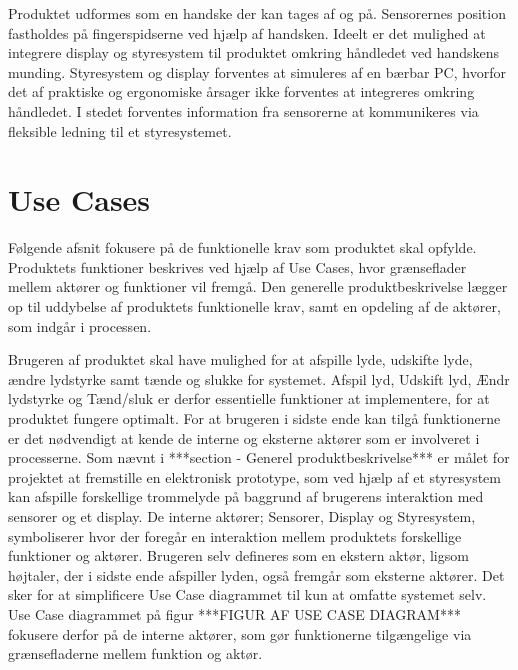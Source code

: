 Produktet udformes som en handske der kan tages af og på. Sensorernes position fastholdes på fingerspidserne ved hjælp af handsken. Ideelt er det mulighed at integrere display og styresystem til produktet omkring håndledet ved handskens munding. Styresystem og display forventes at simuleres af en bærbar PC, hvorfor det af praktiske og ergonomiske årsager ikke forventes at integreres omkring håndledet. I stedet forventes information fra sensorerne at kommunikeres via fleksible ledning til et styresystemet. 

\section{Use Cases}
Følgende afsnit fokusere på de funktionelle krav som produktet skal opfylde. Produktets funktioner beskrives ved hjælp af Use Cases, hvor grænseflader mellem aktører og funktioner vil fremgå. Den generelle produktbeskrivelse lægger op til uddybelse af produktets funktionelle krav, samt en opdeling af de aktører, som indgår i processen.

Brugeren af produktet skal have mulighed for at afspille lyde, udskifte lyde, ændre lydstyrke samt tænde og slukke for systemet. Afspil lyd, Udskift lyd, Ændr lydstyrke og Tænd/sluk er derfor essentielle funktioner at implementere, for at produktet fungere optimalt. For at brugeren i sidste ende kan tilgå funktionerne er det nødvendigt at kende de interne og eksterne aktører som er involveret i  processerne. Som nævnt i ***section - Generel produktbeskrivelse*** er målet for projektet at fremstille en elektronisk prototype, som ved hjælp af et styresystem kan afspille forskellige trommelyde på baggrund af brugerens interaktion med sensorer og et display. De interne aktører; Sensorer, Display og Styresystem, symboliserer hvor der foregår en interaktion mellem produktets forskellige funktioner og aktører. Brugeren selv defineres som en ekstern aktør, ligsom højtaler, der i sidste ende afspiller lyden, også fremgår som eksterne aktører. Det sker for at simplificere Use Case diagrammet til kun at omfatte systemet selv. Use Case diagrammet på figur ***FIGUR AF USE CASE DIAGRAM*** fokusere derfor på de interne aktører, som gør funktionerne tilgængelige via grænsefladerne mellem funktion og aktør. 

